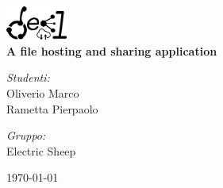 \begin{titlepage}
\begin{center}

~\\[5cm]
\includegraphics[width=0.15\textwidth]{./logo}~\\[1cm]

{ \huge \bfseries A file hosting and sharing application\\[5.4cm] }


\begin{minipage}{0.4\textwidth}
\begin{flushleft} \large
\emph{Studenti:}\\
Oliverio  Marco \\
Rametta  Pierpaolo
\end{flushleft}
\end{minipage}
\begin{minipage}{0.4\textwidth}
\begin{flushright} \large
\emph{Gruppo:} \\
Electric Sheep 
\end{flushright}
\end{minipage}

\vfill

{\large \today}

\end{center}
\end{titlepage}